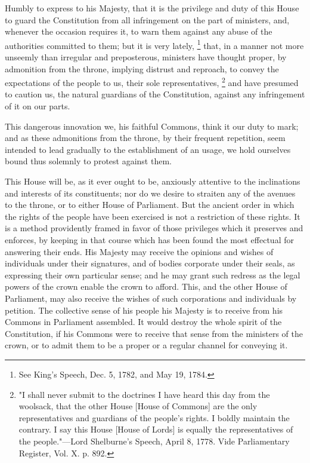 Humbly to express to his Majesty, that it is the privilege and duty of this House to guard the Constitution from all infringement on the part of ministers, and, whenever the occasion requires it, to warn them against any abuse of the authorities committed to them; but it is very lately,
\footnote{ See King's Speech, Dec. 5, 1782, and May 19, 1784.}
 that, in a manner not more unseemly than irregular and preposterous, ministers have thought proper, by admonition from the throne, implying distrust and reproach, to convey the expectations of the people to us, their sole representatives, 
\footnote{ "I shall never submit to the doctrines I have heard this day from the woolsack, that the other House [House of Commons] are the only representatives and guardians of the people's rights. I boldly maintain the contrary. I say this House [House of Lords] is equally the representatives of the people."—Lord Shelburne's Speech, April 8, 1778. Vide Parliamentary Register, Vol. X. p. 892.}
 and have presumed to caution us, the natural guardians of the Constitution, against any infringement of it on our parts.

This dangerous innovation we, his faithful Commons, think it our duty to mark; and as these admonitions from the throne, by their frequent repetition, seem intended to lead gradually to the establishment of an usage, we hold ourselves bound thus solemnly to protest against them.

This House will be, as it ever ought to be, anxiously attentive to the inclinations and interests of its constituents; nor do we desire to straiten any of the avenues to the throne, or to either House of Parliament. But the ancient order in which the rights of the people have been exercised is not a restriction of these rights. It is a method providently framed in favor of those privileges which it preserves and enforces, by keeping in that course which has been found the most effectual for answering their ends. His Majesty may receive the opinions and wishes of individuals under their signatures, and of bodies corporate under their seals, as expressing their own particular sense; and he may grant such redress as the legal powers of the crown enable the crown to afford. This, and the other House of Parliament, may also receive the wishes of such corporations and individuals by petition. The collective sense of his people his Majesty is to receive from his Commons in Parliament assembled. It would destroy the whole spirit of the Constitution, if his Commons were to receive that sense from the ministers of the crown, or to admit them to be a proper or a regular channel for conveying it.

